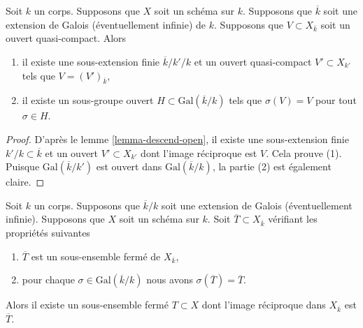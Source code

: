 \begin{lemma}
\label{lemma-Galois-action-quasi-compact-open}
Soit $k$ un corps. Supposons que $X$ soit un
schéma sur $k$. Supposons que $\overline{k}$ soit une
extension de Galois (éventuellement infinie) de $k$. Supposons que
$V \subset X_{\overline{k}}$ soit un ouvert quasi-compact. Alors
\begin{enumerate}
\item il existe une sous-extension finie
$\overline{k}/k'/k$ et un ouvert quasi-compact $V'
\subset X_{k'}$ tels que $V = (V')_{\overline{k}}$, \item il
existe un sous-groupe ouvert $H \subset
\text{Gal}(\overline{k}/k)$ tels que $\sigma(V) = V$ pour tout $\sigma \in H$.
\end{enumerate}
\end{lemma}

\begin{proof}
D'après le lemme \ref{lemma-descend-open}, il existe une sous-extension
finie $k'/k \subset \overline{k}$ et un ouvert $V' \subset X_{k'}$ dont
l'image réciproque est $V$. Cela prouve (1). Puisque $\text{Gal}(\overline{k}/k')$ est
ouvert dans $\text{Gal}(\overline{k}/k)$, la partie (2) est également claire.
\end{proof}

\begin{lemma}
\label{lemma-closed-fixed-by-Galois}
Soit $k$ un corps. Supposons que $\overline{k}/k$ soit une
extension de Galois (éventuellement infinie). Supposons que $X$ soit un schéma
sur $k$. Soit $\overline{T} \subset X_{\overline{k}}$ vérifiant les propriétés suivantes
\begin{enumerate}
\item $\overline{T}$ est un sous-ensemble fermé de
$X_{\overline{k}}$, \item pour chaque $\sigma \in
\text{Gal}(\overline{k}/k)$ nous avons $\sigma(\overline{T}) = \overline{T}$.
\end{enumerate}
Alors il existe un sous-ensemble fermé $T \subset X$ dont
l'image réciproque dans $X_{\overline{k}}$ est $\overline{T}$.
\end{lemma}

